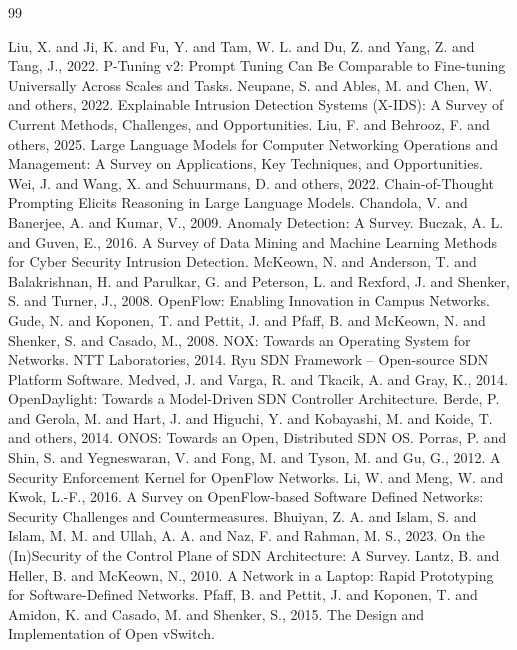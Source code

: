 \documentclass[12pt,a4paper]{article}
\begin{document}
\begin{thebibliography}{99}
\raggedright
{} Liu, X. and Ji, K. and Fu, Y. and Tam, W. L. and Du, Z. and Yang, Z. and Tang, J., 2022. P-Tuning v2: Prompt Tuning Can Be Comparable to Fine-tuning Universally Across Scales and Tasks.
 Neupane, S. and Ables, M. and Chen, W. and others, 2022. Explainable Intrusion Detection Systems (X-IDS): A Survey of Current Methods, Challenges, and Opportunities.
 Liu, F. and Behrooz, F. and others, 2025. Large Language Models for Computer Networking Operations and Management: A Survey on Applications, Key Techniques, and Opportunities.
 Wei, J. and Wang, X. and Schuurmans, D. and others, 2022. Chain-of-Thought Prompting Elicits Reasoning in Large Language Models.
 Chandola, V. and Banerjee, A. and Kumar, V., 2009. Anomaly Detection: A Survey.
 Buczak, A. L. and Guven, E., 2016. A Survey of Data Mining and Machine Learning Methods for Cyber Security Intrusion Detection.
 McKeown, N. and Anderson, T. and Balakrishnan, H. and Parulkar, G. and Peterson, L. and Rexford, J. and Shenker, S. and Turner, J., 2008. OpenFlow: Enabling Innovation in Campus Networks.
 Gude, N. and Koponen, T. and Pettit, J. and Pfaff, B. and McKeown, N. and Shenker, S. and Casado, M., 2008. NOX: Towards an Operating System for Networks.
 NTT Laboratories, 2014. Ryu SDN Framework -- Open-source SDN Platform Software.
 Medved, J. and Varga, R. and Tkacik, A. and Gray, K., 2014. OpenDaylight: Towards a Model-Driven SDN Controller Architecture.
 Berde, P. and Gerola, M. and Hart, J. and Higuchi, Y. and Kobayashi, M. and Koide, T. and others, 2014. ONOS: Towards an Open, Distributed SDN OS.
 Porras, P. and Shin, S. and Yegneswaran, V. and Fong, M. and Tyson, M. and Gu, G., 2012. A Security Enforcement Kernel for OpenFlow Networks.
 Li, W. and Meng, W. and Kwok, L.-F., 2016. A Survey on OpenFlow-based Software Defined Networks: Security Challenges and Countermeasures.
 Bhuiyan, Z. A. and Islam, S. and Islam, M. M. and Ullah, A. A. and Naz, F. and Rahman, M. S., 2023. On the (In)Security of the Control Plane of SDN Architecture: A Survey.
 Lantz, B. and Heller, B. and McKeown, N., 2010. A Network in a Laptop: Rapid Prototyping for Software-Defined Networks.
 Pfaff, B. and Pettit, J. and Koponen, T. and Amidon, K. and Casado, M. and Shenker, S., 2015. The Design and Implementation of Open vSwitch.

\end{thebibliography}
\end{document}
